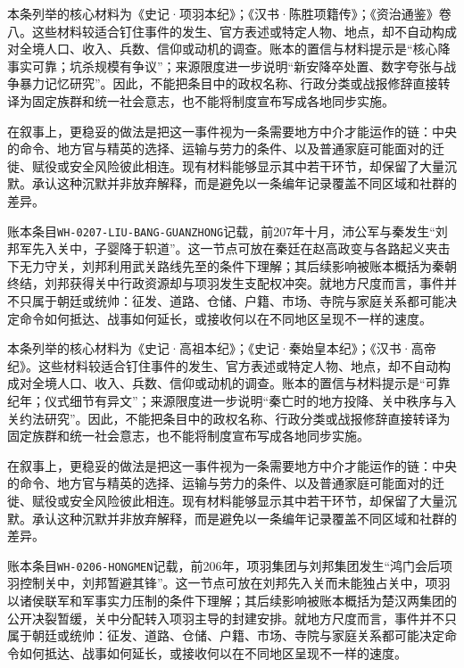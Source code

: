 本条列举的核心材料为《史记·项羽本纪》；《汉书·陈胜项籍传》；《资治通鉴》卷八。这些材料较适合钉住事件的发生、官方表述或特定人物、地点，却不自动构成对全境人口、收入、兵数、信仰或动机的调查。账本的置信与材料提示是“核心降事实可靠；坑杀规模有争议”；来源限度进一步说明“新安降卒处置、数字夸张与战争暴力记忆研究”。因此，不能把条目中的政权名称、行政分类或战报修辞直接转译为固定族群和统一社会意志，也不能将制度宣布写成各地同步实施。

在叙事上，更稳妥的做法是把这一事件视为一条需要地方中介才能运作的链：中央的命令、地方官与精英的选择、运输与劳力的条件、以及普通家庭可能面对的迁徙、赋役或安全风险彼此相连。现有材料能够显示其中若干环节，却保留了大量沉默。承认这种沉默并非放弃解释，而是避免以一条编年记录覆盖不同区域和社群的差异。

账本条目\texttt{WH-0207-LIU-BANG-GUANZHONG}记载，前207年十月，沛公军与秦发生“刘邦军先入关中，子婴降于轵道”。这一节点可放在秦廷在赵高政变与各路起义夹击下无力守关，刘邦利用武关路线先至的条件下理解；其后续影响被账本概括为秦朝终结，刘邦获得关中行政资源却与项羽发生支配权冲突。就地方尺度而言，事件并不只属于朝廷或统帅：征发、道路、仓储、户籍、市场、寺院与家庭关系都可能决定命令如何抵达、战事如何延长，或接收何以在不同地区呈现不一样的速度。

本条列举的核心材料为《史记·高祖本纪》；《史记·秦始皇本纪》；《汉书·高帝纪》。这些材料较适合钉住事件的发生、官方表述或特定人物、地点，却不自动构成对全境人口、收入、兵数、信仰或动机的调查。账本的置信与材料提示是“可靠纪年；仪式细节有异文”；来源限度进一步说明“秦亡时的地方投降、关中秩序与入关约法研究”。因此，不能把条目中的政权名称、行政分类或战报修辞直接转译为固定族群和统一社会意志，也不能将制度宣布写成各地同步实施。

在叙事上，更稳妥的做法是把这一事件视为一条需要地方中介才能运作的链：中央的命令、地方官与精英的选择、运输与劳力的条件、以及普通家庭可能面对的迁徙、赋役或安全风险彼此相连。现有材料能够显示其中若干环节，却保留了大量沉默。承认这种沉默并非放弃解释，而是避免以一条编年记录覆盖不同区域和社群的差异。

账本条目\texttt{WH-0206-HONGMEN}记载，前206年，项羽集团与刘邦集团发生“鸿门会后项羽控制关中，刘邦暂避其锋”。这一节点可放在刘邦先入关而未能独占关中，项羽以诸侯联军和军事实力压制的条件下理解；其后续影响被账本概括为楚汉两集团的公开决裂暂缓，关中分配转入项羽主导的封建安排。就地方尺度而言，事件并不只属于朝廷或统帅：征发、道路、仓储、户籍、市场、寺院与家庭关系都可能决定命令如何抵达、战事如何延长，或接收何以在不同地区呈现不一样的速度。

